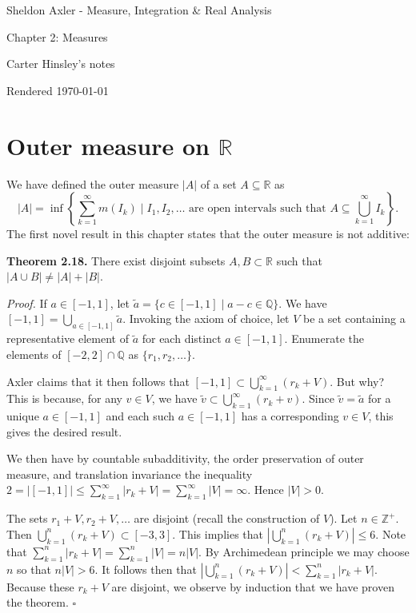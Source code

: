 \documentclass[a4paper]{article}
\newcommand{\R}{\mathbb{R}}
\newcommand{\Q}{\mathbb{Q}}
\newcommand{\Z}{\mathbb{Z}}
\begin{document}
\begin{center}
\LARGE{Sheldon Axler - Measure, Integration \& Real Analysis}

\Large{Chapter 2: Measures}

\large{Carter Hinsley's notes}

Rendered \today
\end{center}

\section{Outer measure on $\R$}

We have defined the outer measure $|A|$ of a set $A \subseteq \R$ as
\[|A| = \inf\left\{\sum_{k=1}^\infty m(I_k) \mid I_1, I_2, \ldots \text{ are open intervals such that } A \subseteq \bigcup_{k=1}^\infty I_k\right\}.\]
The first novel result in this chapter states that the outer measure is not additive:

\textbf{Theorem 2.18.} There exist disjoint subsets $A, B \subset \R$ such that $|A \cup B| \neq |A| + |B|$.

\emph{Proof.} If $a \in [-1, 1]$, let $\tilde{a} = \{c \in [-1, 1] \mid a - c \in \Q\}$. We have $[-1, 1] = \bigcup_{a \in [-1, 1]} \tilde{a}$. Invoking the axiom of choice, let $V$ be a set containing a representative element of $\tilde{a}$ for each distinct $a \in [-1, 1]$. Enumerate the elements of $[-2, 2] \cap \Q$ as $\{r_1, r_2, \ldots\}$.

Axler claims that it then follows that $[-1, 1] \subset \bigcup_{k=1}^\infty (r_k + V)$. But why? This is because, for any $v \in V$, we have $\tilde{v} \subset \bigcup_{k=1}^\infty (r_k + v)$. Since $\tilde{v} = \tilde{a}$ for a unique $a \in [-1, 1]$ and each such $a \in [-1, 1]$ has a corresponding $v \in V$, this gives the desired result.

We then have by countable subadditivity, the order preservation of outer measure, and translation invariance the inequality $2 = |[-1, 1]| \leq \sum_{k=1}^\infty |r_k + V| = \sum_{k=1}^\infty |V| = \infty$. Hence $|V| > 0$.

The sets $r_1 + V, r_2 + V, \ldots$ are disjoint (recall the construction of $V$). Let $n \in \Z^+$. Then $\bigcup_{k=1}^n (r_k + V) \subset [-3, 3]$. This implies that $\left|\bigcup_{k=1}^n (r_k + V)\right| \leq 6$. Note that $\sum_{k=1}^n |r_k + V| = \sum_{k=1}^n |V| = n|V|$. By Archimedean principle we may choose $n$ so that $n|V| > 6$. It follows then that $\left|\bigcup_{k=1}^n (r_k + V)\right| < \sum_{k=1}^n |r_k + V|$. Because these $r_k + V$ are disjoint, we observe by induction that we have proven the theorem. $\square$
\end{document}
